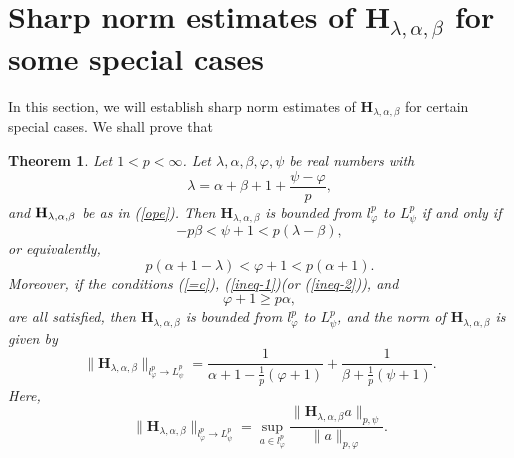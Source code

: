 \documentclass[10pt]{amsart}
\newtheorem{theorem}{Theorem}[section]
\theoremstyle{definition}    %
\numberwithin{equation}{section}
\begin{document}
\section{{\bf Sharp norm estimates of $\mathbf{H}_{\lambda, \alpha, \beta}$ for some special cases}}
In this section, we will establish sharp norm estimates of $\mathbf{H}_{\lambda, \alpha, \beta}$ for certain special cases. We shall prove that
\begin{theorem}\label{last}
Let $1<p<\infty$. Let $\lambda, \alpha, \beta, \varphi, \psi$ be real numbers with
\begin{equation}\label{=c}\lambda=\alpha+\beta+1+\frac{\psi-\varphi}{p},\end{equation}
and ${\bf H}_{\lambda, \alpha, \beta}$ be as in (\ref{ope}). Then $\mathbf{H}_{\lambda, \alpha, \beta}$ is bounded from $l_{\varphi}^{p}$ to $L_{\psi}^{p}$ if and only if 
\begin{equation} \label{ineq-1}
-p\beta<\psi+1<p(\lambda-\beta),  
\end{equation}
or equivalently, 
\begin{equation}\label{ineq-2} 
p(\alpha+1-\lambda)<\varphi+1<p(\alpha+1). 
\end{equation}
Moreover, if the conditions (\ref{=c}), (\ref{ineq-1})(or (\ref{ineq-2})), and 
\begin{equation}\label{ineq-3}
\varphi+1\geq p\alpha,
\end{equation}
are all satisfied, then $\mathbf{H}_{\lambda, \alpha, \beta}$ is bounded from $l_{\varphi}^{p}$ to $L_{\psi}^{p}$, and the norm of $\mathbf{H}_{\lambda, \alpha, \beta}$ is given by
 $$\|\mathbf{H}_{\lambda, \alpha, \beta}\|_{l_{\varphi}^{p}\rightarrow L_{\psi}^p}=\frac{1}{\alpha+1-\frac{1}{p}(\varphi+1)}+\frac{1}{\beta+\frac{1}{p}(\psi+1)}.$$ 
Here, $$\|\mathbf{H}_{\lambda, \alpha, \beta}\|_{l_{\varphi}^{p}\rightarrow L_{\psi}^p}=\sup_{a\in l_{\varphi}^{p}}\frac{\|\mathbf{H}_{\lambda,\alpha,\beta}a\|_{p, \psi}}{\|a\|_{p, \varphi}}.$$
\end{theorem}
\end{document}
